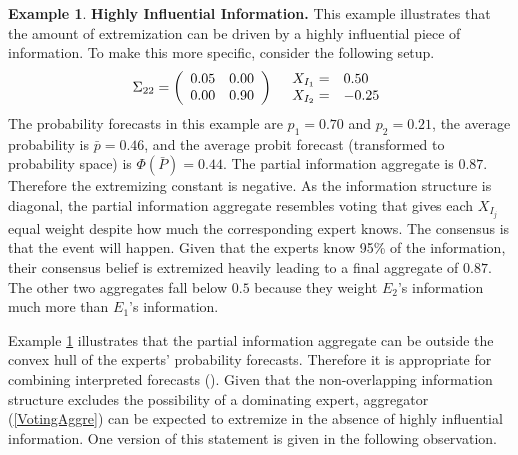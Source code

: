 \documentclass[11pt,twoside]{article}
\theoremstyle{definition}
\newtheorem{example}[theorem]{Example}
\theoremstyle{definition}
\begin{document}
\begin{example}
\label{KeyInfo}
\textbf{Highly Influential Information.} This example illustrates that the amount of extremization can be driven by a highly influential piece of information. To make this more specific, consider the following setup.
\begin{align*}
\Sigma_{22} =  \left(\begin{array}{c c}
0.05 & 0.00\\
0.00 & 0.90 \\
 \end{array}\right)
  && 
  \begin{array}{l l}
X_{I_1} =& 0.50\\
X_{I_2} =& -0.25
 \end{array}
\end{align*}
The probability forecasts in this example are $p_1 = 0.70$ and $p_2 = 0.21$, the average probability is $\bar{p} = 0.46$, and the average probit forecast (transformed to probability space) is $\Phi(\bar{P}) = 0.44$.  The partial information aggregate is $0.87$. Therefore the extremizing constant is negative. As the information structure is diagonal, the partial information aggregate resembles voting that gives each $X_{I_j}$ equal weight despite how much the corresponding expert knows. The consensus is that the event will happen. Given that the experts know 95\% of the information, their consensus belief is extremized heavily leading to a final aggregate of $0.87$. The other two aggregates fall below $0.5$ because they weight $E_2$'s information much more than $E_1$'s information.
\end{example}

Example \ref{KeyInfo} illustrates that the partial information aggregate can be outside the convex hull of the experts' probability forecasts. Therefore it is appropriate for combining interpreted forecasts (\cite{parunak2013characterizing}). Given that the non-overlapping information structure excludes the possibility of a dominating expert, aggregator (\ref{VotingAggre}) can be expected to extremize in the absence of highly influential information. 
% 
One version of this statement is given in the following observation.
 
\end{document}
